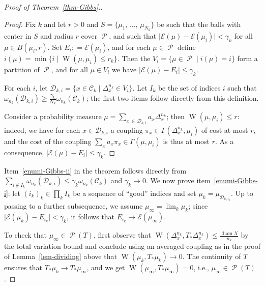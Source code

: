 \documentclass[AHL, Unicode, longabstracts,published]{cedram}
\theoremstyle{plain}
\theoremstyle{plain}
\newcommand{\wass}{\operatorname{W}}
\newcommand{\diam}{\operatorname{diam}}
\newcommand\Prob{{\operatorname{\mathscr{P}}}}
\newcommand*\8{\infty}
\newcommand{\En}{\mathcal{E}}
\newcommand{\cD}{\mathcal{D}}
\newcommand{\cC}{\mathcal C}
\begin{document}
\begin{proof}[Proof of Theorem~\ref{thm-Gibbs}.]
\begin{proof}
Fix $k$ and let $r>0$ and $S=\{\mu_1,\,\dots,\,\mu_{N_k}\}$ be such that the balls with center in $S$ and radius $r$ cover $\Prob$, and such that $\lvert\En(\mu)-\En(\mu_i)\rvert<\gamma_k$ for all $\mu\in B(\mu_i,r)$. Set $E_i : =\En(\mu_i)$, and for each $\mu\in\Prob$ define $i(\mu) = \min\{i \mid \wass(\mu,\mu_i)\le r_k\}$. Then the $V_i=\{\mu\in \Prob\mid i(\mu)=i\}$ form a partition of $\Prob$, and for all $\mu\in V_i$ we have $\lvert \En(\mu) - E_i\rvert \le \gamma_k$.

For each $i$, let $\cD_{k,i} = \{x\in \cC_{k} \mid \Delta_x^{n_k}\in V_i\}$. Let $I_k$ be the set of indices $i$ such that $\omega_{n_k}(\cD_{k,i})\ge \frac{\gamma_k}{N_k} \omega_{n_k}(\cC_k)$; the first two items follow directly from this definition.

Consider a probability measure $\mu= \sum_{x\,\in\,\cD_{k,i}} a_x \Delta_x^{n_k}$; then $\wass(\mu,\mu_i)\le r$: indeed, we have for each $x\in \cD_{k,i}$ a coupling $\pi_x\in\Gamma(\Delta_x^{n_k},\mu_i)$ of cost at most $r$, and the cost of the coupling $\sum_x a_x \pi_x\in\Gamma(\mu,\mu_i)$ is thus at most $r$. As a consequence, $\lvert \En(\mu)-E_i\rvert \le \gamma_k$.
\end{proof}

Item~\eqref{enumi-Gibbs-ii} in the theorem follows directly from $\sum_{i\notin I_k}\omega_{n_k}(\cD_{k,i})\le \gamma_k \omega_{n_k}(\cC_k)$ and $\gamma_k\to 0$. We now prove item~\eqref{enumi-Gibbs-i}: let $(i_k)_k \in \prod_k I_k$ be a sequence of ``good'' indices and set $\mu_k = \mu_{\cD_{k,i_k}}$. Up to passing to a further subsequence, we assume $\mu_\infty=\lim_k \mu_k$; since $\lvert \En(\mu_k)-E_{i_k}\rvert < \gamma_k$, it follows that $E_{i_k} \to \En(\mu_\infty)$.

To check that $\mu_\infty\in\Prob(T)$, first observe that $\wass(\Delta_x^{n_k},T_*\Delta_x^{n_k})\le \frac{\diam X}{n_k}$ by the total variation bound and conclude using an averaged coupling as in the proof of Lemma~\ref{lem-dividing} above that $\wass(\mu_k,T_*\mu_k)\to 0$. The continuity of $T$ ensures that $T_*\mu_k\to T_*\mu_\infty$, and we get $\wass(\mu_\infty,T_*\mu_\infty)=0$, i.e., $\mu_\infty\in\Prob(T)$.


\end{proof}
\end{document}
